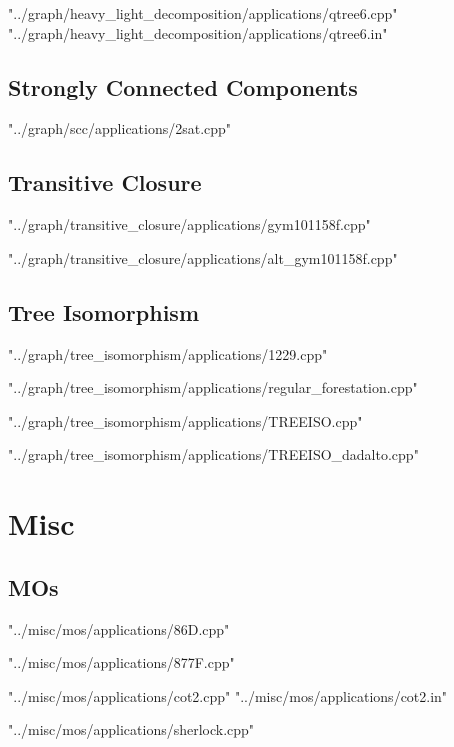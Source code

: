 \documentclass [12pt,onecolumn,oneside]{article}
\begin{document}
 {"../graph/heavy_light_decomposition/applications/qtree6.cpp"}
 {"../graph/heavy_light_decomposition/applications/qtree6.in"}
\newpage

\subsection{ Strongly Connected Components}
 {"../graph/scc/applications/2sat.cpp"}
\newpage

\subsection{ Transitive Closure}
 {"../graph/transitive_closure/applications/gym101158f.cpp"}
\newpage

 {"../graph/transitive_closure/applications/alt_gym101158f.cpp"}
\newpage

\subsection{ Tree Isomorphism}
 {"../graph/tree_isomorphism/applications/1229.cpp"}
\newpage

 {"../graph/tree_isomorphism/applications/regular_forestation.cpp"}
\newpage

 {"../graph/tree_isomorphism/applications/TREEISO.cpp"}
\newpage

 {"../graph/tree_isomorphism/applications/TREEISO_dadalto.cpp"}
\newpage


\section{Misc}
\subsection{ MOs}
 {"../misc/mos/applications/86D.cpp"}
\newpage

 {"../misc/mos/applications/877F.cpp"}
\newpage

 {"../misc/mos/applications/cot2.cpp"}
 {"../misc/mos/applications/cot2.in"}
\newpage

 {"../misc/mos/applications/sherlock.cpp"}
\newpage
\end{document}
